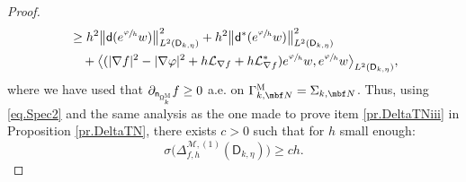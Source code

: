 \begin{proof}
\begin{equation}
\begin{aligned}
&\ge
h^{2}\big \| \mathsf d (e^{\sfrac{\varphi}{h}} w)\big \|^{2}_{ L^{2} (\mathsf D_{k,\eta})}+
h^{2} \big \| \mathsf d^{*} (e^{\sfrac{\varphi}{h}} w) \big \|^{2}_{ L^{2} (\mathsf D_{k,\eta})}\\
&\quad + \big \langle
(|\nabla f|^{2}-|\nabla \varphi|^{2}+h\mathcal{L}_{\nabla
f}+h\mathcal{L}_{\nabla
f}^{*})e^{\sfrac{\varphi}{h}} w, e^{\sfrac{\varphi}{h}}
w\big \rangle_{ L^{2} (\mathsf D_{k,\eta})},
\end{aligned}
\end{equation}
where we have used that $\partial_{\mathsf n_{ \mathsf \Omega_k^{\textsc{M}} } }f\ge 0$ a.e. on $\Gamma_{k,\mbf N}^{\textsc{M}}=\Sigma_{k,\mbf N}$.
Thus, using \eqref{eq.Spec2} and the same analysis as the one made to prove item \eqref{pr.DeltaTNiii} in Proposition \ref{pr.DeltaTN}, there exists $c>0$ such that for $h$ small enough:
\begin{equation}\label{eq.Spec1}
\sigma \bigl(\Delta_{f,h}^{ \mathcal M,(1)} (\mathsf D_{k,\eta})\bigr)\ge ch.
\end{equation}


\end{proof}
